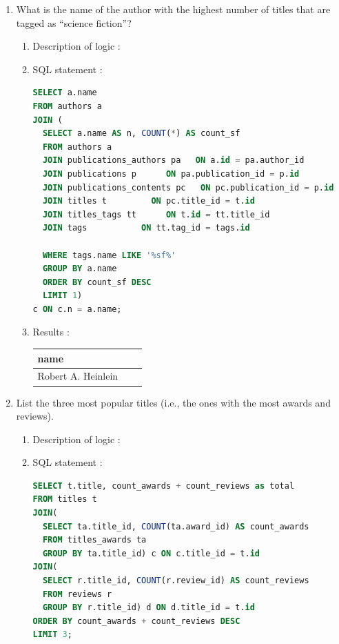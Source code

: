 \documentclass[doubleside, titlepage]{article}
\begin{document}
\begin{enumerate}
\begin{enumerate}
\end{enumerate}	
	
\item What is the name of the author with the highest number of titles that are tagged as “science fiction”?

	\begin{enumerate}
	\item Description of logic :\\
	\item SQL statement :
		\begin{lstlisting}[language=SQL,showspaces=false,basicstyle=\ttfamily,numberstyle=\tiny,commentstyle=\color{gray}]
SELECT a.name
FROM authors a
JOIN (
  SELECT a.name AS n, COUNT(*) AS count_sf
  FROM authors a
  JOIN publications_authors pa   ON a.id = pa.author_id
  JOIN publications p      ON pa.publication_id = p.id
  JOIN publications_contents pc   ON pc.publication_id = p.id
  JOIN titles t         ON pc.title_id = t.id
  JOIN titles_tags tt      ON t.id = tt.title_id
  JOIN tags           ON tt.tag_id = tags.id

  WHERE tags.name LIKE '%sf%'
  GROUP BY a.name
  ORDER BY count_sf DESC
  LIMIT 1)
c ON c.n = a.name;
		\end{lstlisting}

	\item Results :\\
	
	\begin{tabular}{|l|c|r|}
	  \hline
		name\\
	  \hline	
		Robert A. Heinlein\\
	  \hline
	\end{tabular}
\end{enumerate}
	
\item List the three most popular titles (i.e., the ones with the most awards and reviews).

	\begin{enumerate}
	\item Description of logic :\\
	\item SQL statement :
		\begin{lstlisting}[language=SQL,showspaces=false,basicstyle=\ttfamily,numberstyle=\tiny,commentstyle=\color{gray}]
SELECT t.title, count_awards + count_reviews as total
FROM titles t
JOIN(
  SELECT ta.title_id, COUNT(ta.award_id) AS count_awards
  FROM titles_awards ta
  GROUP BY ta.title_id) c ON c.title_id = t.id
JOIN(
  SELECT r.title_id, COUNT(r.review_id) AS count_reviews
  FROM reviews r
  GROUP BY r.title_id) d ON d.title_id = t.id
ORDER BY count_awards + count_reviews DESC
LIMIT 3;
		\end{lstlisting}


\end{enumerate}
\end{enumerate}
\end{document}
